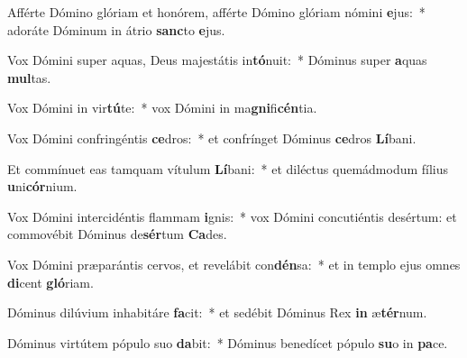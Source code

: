 \item Afférte Dómino glóriam et honórem, afférte Dómino glóriam nómini \textbf{e}jus:~* adoráte Dóminum in átrio \textbf{sanc}to \textbf{e}jus.
\item Vox Dómini super aquas, Deus majestátis in\textbf{tó}nuit:~* Dóminus super \textbf{a}quas \textbf{mul}tas.
\item Vox Dómini in vir\textbf{tú}te:~* vox Dómini in ma\textbf{gni}fi\textbf{cén}tia.
\item Vox Dómini confringéntis \textbf{ce}dros:~* et confrínget Dóminus \textbf{ce}dros \textbf{Lí}bani.
\item Et commínuet eas tamquam vítulum \textbf{Lí}bani:~* et diléctus quemádmodum fílius \textbf{u}ni\textbf{cór}nium.
\item Vox Dómini intercidéntis flammam \textbf{i}gnis:~* vox Dómini concutiéntis desértum: et commovébit Dóminus de\textbf{sér}tum \textbf{Ca}des.
\item Vox Dómini præparántis cervos, et revelábit con\textbf{dén}sa:~* et in templo ejus omnes \textbf{di}cent \textbf{gló}riam.
\item Dóminus dilúvium inhabitáre \textbf{fa}cit:~* et sedébit Dóminus Rex \textbf{in} æ\textbf{tér}num.
\item Dóminus virtútem pópulo suo \textbf{da}bit:~* Dóminus benedícet pópulo \textbf{su}o in \textbf{pa}ce.

